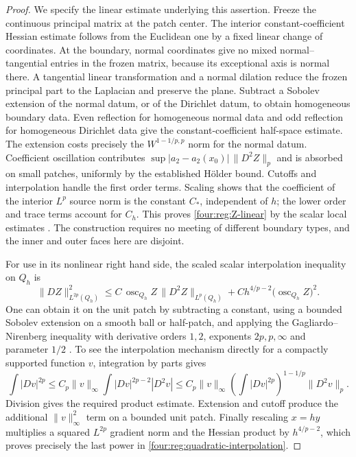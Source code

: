 \begin{proof}
We specify the linear estimate underlying this assertion.  Freeze
the continuous principal matrix at the patch center.  The interior
constant-coefficient Hessian estimate follows from the Euclidean
one by a fixed linear change of coordinates.  At the boundary,
normal coordinates give no mixed normal--tangential entries in
the frozen matrix, because its exceptional axis is normal there.
A tangential linear transformation and a normal dilation reduce
the frozen principal part to the Laplacian and preserve the plane.
Subtract a Sobolev extension of the normal datum, or of the
Dirichlet datum, to obtain homogeneous boundary data.  Even
reflection for homogeneous normal data and odd reflection for
homogeneous Dirichlet data give the constant-coefficient half-space
estimate.  The extension costs precisely the
$W^{1-1/p,p}$ norm for the normal datum.  Coefficient oscillation
contributes $\sup|a_2-a_2(x_0)|\,\|D^2Z\|_p$ and is absorbed on
small patches, uniformly by the established H\"older bound.
Cutoffs and interpolation handle the first order terms.  Scaling
shows that the coefficient of the interior $L^p$ source norm is
the constant $C_*$, independent of $h$; the lower order and trace
terms account for $C_h$.  This proves
\eqref{four:reg:Z-linear} by the scalar local estimates
\cite{GilbargTrudinger2001}.  The construction requires no meeting of different
boundary types, and the inner and outer faces here are disjoint.

For use in its nonlinear right hand side, the scaled scalar
interpolation inequality on $Q_h$ is
\begin{equation}\label{four:reg:quadratic-interpolation}
 \|DZ\|_{L^{2p}(Q_h)}^2
 \le C\,\operatorname{osc}_{Q_h}Z\,
                  \|D^2Z\|_{L^p(Q_h)}
       +Ch^{4/p-2}\bigl(\operatorname{osc}_{Q_h}Z\bigr)^2.
\end{equation}
One can obtain it on the unit patch by subtracting a constant,
using a bounded Sobolev extension on a smooth ball or half-patch,
and applying the Gagliardo--Nirenberg inequality with derivative
orders $1,2$, exponents $2p,p,\infty$ and parameter $1/2$
\cite[Theorem~1.3]{LiZhang2022}.  To see the interpolation mechanism directly
for a compactly supported function $v$, integration by parts gives
\[
 \int|Dv|^{2p}
 \le C_p\|v\|_\infty
             \int|Dv|^{2p-2}|D^2v|
 \le C_p\|v\|_\infty
      \left(\int|Dv|^{2p}\right)^{1-1/p}\|D^2v\|_p.
\]
Division gives the required product estimate.  Extension and
cutoff produce the additional $\|v\|_\infty^2$ term on a bounded
unit patch.  Finally rescaling $x=hy$ multiplies a squared
$L^{2p}$ gradient norm and the Hessian product by $h^{4/p-2}$,
which proves precisely the last power in
\eqref{four:reg:quadratic-interpolation}.


\end{proof}
